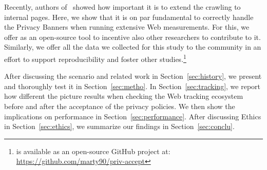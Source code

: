 Recently, authors of~\cite{aqeel2020on} showed how important it is to extend the crawling to internal pages. Here, we show that it is on par fundamental to correctly handle the Privacy Banners when running extensive Web measurements. For this, we offer \TOOL as an open-source tool to incentive also other researchers to contribute to it. Similarly, we offer all the data we collected for this study to the community in an effort to support reproducibility and foster other studies.\footnote{\TOOL is available as an open-source GitHub project at: \url{https://github.com/marty90/priv-accept}}

After discussing the scenario and related work in Section~\ref{sec:history}, we present \TOOL and thoroughly test it in Section~\ref{sec:metho}. In Section~\ref{sec:tracking}, we report how different the picture results when checking the Web tracking ecosystem before and after the acceptance of the privacy policies. We then show the implications on performance in Section~\ref{sec:performance}. After discussing Ethics in Section~\ref{sec:ethics}, we summarize our findings in Section~\ref{sec:conclu}.
